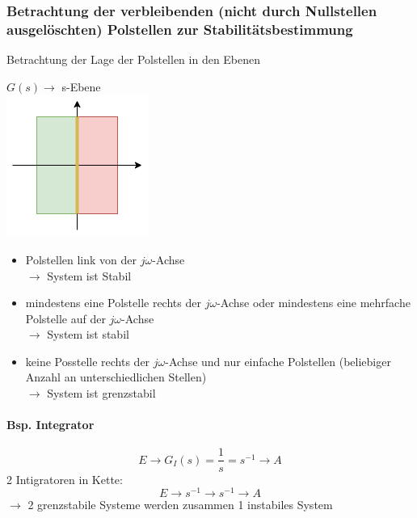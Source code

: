 \documentclass[a4paper]{article}
\begin{document}
\subsubsection*{Betrachtung der verbleibenden (nicht durch Nullstellen ausgelöschten) Polstellen zur Stabilitätsbestimmung}
Betrachtung der Lage der Polstellen in den Ebenen
\begin{paracol}{2}
$G(s) \rightarrow$  s-Ebene \\
\includegraphics[scale=0.8]{img/2024_11_20_s-Ebene.png}
\begin{itemize}
	\item Polstellen link von der $j\omega$-Achse \\
	$\rightarrow$ System ist Stabil
	\item mindestens eine Polstelle rechts der $j\omega$-Achse oder mindestens eine mehrfache Polstelle auf der $j\omega$-Achse \\
	$\rightarrow$ System ist stabil
	\item keine Posstelle rechts der $j\omega$-Achse und nur einfache Polstellen (beliebiger Anzahl an unterschiedlichen Stellen) \\
	$\rightarrow$ System ist grenzstabil
\end{itemize}
\paragraph{Bsp. Integrator}
\[
E \rightarrow G_I(s)=\frac{1}{s} = s^{-1} \rightarrow A
\]
2 Intigratoren in Kette:
\[
E \rightarrow s^{-1} \rightarrow s^{-1} \rightarrow A
\]
$\rightarrow$ 2 grenzstabile Systeme werden zusammen 1 instabiles System

\switchcolumn


\end{paracol}
\end{document}
